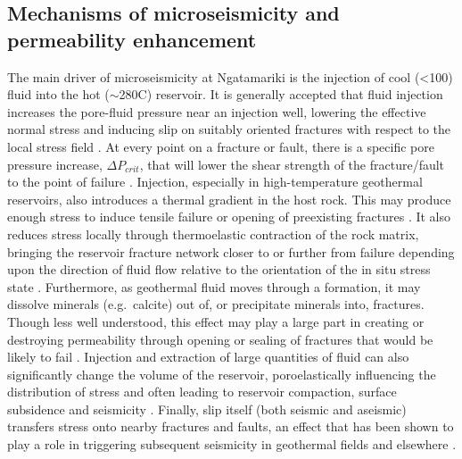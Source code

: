 \subsection{Mechanisms of microseismicity and permeability enhancement}
The main driver of microseismicity at Ngatamariki is the injection of cool (\textless{100}) fluid into the hot ($\sim$280\textdegree C) reservoir. It is generally accepted that fluid injection increases the pore-fluid pressure near an injection well, lowering the effective normal stress and inducing slip on suitably oriented fractures with respect to the local stress field \citep[e.g.][]{Zoback_1997,Ellsworth_2013,Langenbruch_2018}. At every point on a fracture or fault, there is a specific pore pressure increase, $\Delta{P_{crit}}$, that will lower the shear strength of the fracture\slash{fault} to the point of failure \citep{Wiprut_2000}. Injection, especially in high-temperature geothermal reservoirs, also introduces a thermal gradient in the host rock. This may produce enough stress to induce tensile failure or opening of preexisting fractures \citep{Mart_nez_Garz_n_2014}. It also reduces stress locally through thermoelastic contraction of the rock matrix, bringing the reservoir fracture network closer to or further from failure depending upon the direction of fluid flow relative to the orientation of the in situ stress state \citep{Jeanne_2014}. Furthermore, as geothermal fluid moves through a formation, it may dissolve minerals (e.g.\ calcite) out of, or precipitate minerals into, fractures. Though less well understood, this effect may play a large part in creating or destroying permeability through opening or sealing of fractures that would be likely to fail \citep{Clearwater_2015}. Injection and extraction of large quantities of fluid can also significantly change the volume of the reservoir, poroelastically influencing the distribution of stress and often leading to reservoir compaction, surface subsidence and seismicity \citep{Segall_1989,Segall_1998,Bromley_2013}. Finally, slip itself (both seismic and aseismic) transfers stress onto nearby fractures and faults, an effect that has been shown to play a role in triggering subsequent seismicity in geothermal fields and elsewhere \citep{Schoenball_2012,Catalli_2016}.


